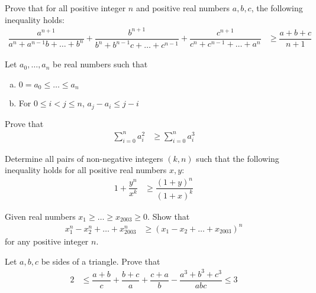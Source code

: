 \documentclass{subfile}
\begin{document}
		\begin{problem}
			Prove that for all positive integer $n$ and positive real numbers $a,b,c$, the following inequality holds:
				\begin{align*}
					\dfrac{a^{n+1}}{a^{n}+a^{n-1}b+\ldots+b^{n}}+\dfrac{b^{n+1}}{b^{n}+b^{n-1}c+\ldots+c^{n-1}}+\dfrac{c^{n+1}}{c^{n}+c^{n-1}+\ldots+a^{n}}
						& \geq\dfrac{a+b+c}{n+1}
				\end{align*}
		\end{problem}
	
		\begin{problem}
			Let $a_{0},\ldots,a_{n}$ be real numbers such that
				\begin{enumerate}[(a)]
					\item $0= a_{0}\leq\ldots\leq a_{n}$
					\item For $0\leq i<j\leq n$, $a_{j}-a_{i}\leq j-i$
				\end{enumerate}
			Prove that
				\begin{align*}
					\sum_{i=0}^{n}a_{i}^{2}
						& \geq\sum_{i=0}^{n}a_{i}^{3}
				\end{align*}
		\end{problem}
	
		\begin{problem}%
			Determine all pairs of non-negative integers $(k,n)$ such that the following inequality holds for all positive real numbers $x,y$:
				\begin{align*}
					1+\dfrac{y^{n}}{x^{k}}
						& \geq\dfrac{(1+y)^{n}}{(1+x)^{k}}
				\end{align*}
		\end{problem}
	
		\begin{problem}
			Given real numbers $x_{1}\geq\ldots\geq x_{2003}\geq0$. Show that
				\begin{align*}
					x_{1}^{n}-x_{2}^{n}+\ldots+x_{2003}^{n}
						& \geq (x_{1}-x_{2}+\ldots+x_{2003})^{n}
				\end{align*}
			for any positive integer $n$.
		\end{problem}
	
		\begin{problem}
			Let $a,b,c$ be sides of a triangle. Prove that
				\begin{align*}
					2
						& \leq \dfrac{a+b}{c}+\dfrac{b+c}{a}+\dfrac{c+a}{b}-\dfrac{a^{3}+b^{3}+c^{3}}{abc}\leq3
				\end{align*}
		\end{problem}
	
\end{document}

